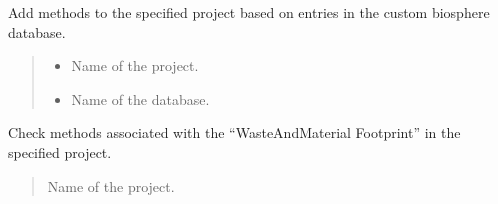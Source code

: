 \documentclass[letterpaper,10pt,english]{sphinxmanual}
\begin{document}
\begin{fulllineitems}
\label{\detokenize{WMFootprint_api:WasteAndMaterialFootprint.MethodEditor.AddMethods}}
\pysigstartsignatures
{}
\pysigstopsignatures
\sphinxAtStartPar
Add methods to the specified project based on entries in the custom biosphere database.
\begin{quote}\begin{description}
\begin{itemize}
\item {} 
\sphinxAtStartPar
{} \textendash{} Name of the project.

\item {} 
\sphinxAtStartPar
{} \textendash{} Name of the database.

\end{itemize}

\end{description}\end{quote}

\end{fulllineitems}


\begin{fulllineitems}
\label{\detokenize{WMFootprint_api:WasteAndMaterialFootprint.MethodEditor.CheckMethods}}
\pysigstartsignatures
{}
\pysigstopsignatures
\sphinxAtStartPar
Check methods associated with the “WasteAndMaterial Footprint” in the specified project.
\begin{quote}\begin{description}
\sphinxAtStartPar
{} \textendash{} Name of the project.

\end{description}\end{quote}

\end{fulllineitems}

\end{document}
